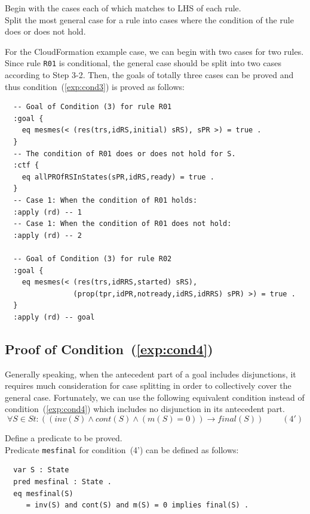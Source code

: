 \documentclass[12pt]{report}
\newcommand{\ra}{\rightarrow}
\begin{document}
\vspace{0.3cm}
 Begin with the cases each of which matches to
LHS of each rule. \\ 
 Split the most general case for a rule into
cases where the condition of the rule does or does not hold. 

For the CloudFormation example case, we can begin with two cases for
two rules. Since rule {\tt R01} is conditional, the general case
should be split into two cases according to Step 3-2. Then, the goals
of totally three cases can be proved and thus
condition~(\ref{exp:cond3}) is proved as follows:
\small
\begin{verbatim}
  -- Goal of Condition (3) for rule R01
  :goal {
    eq mesmes(< (res(trs,idRS,initial) sRS), sPR >) = true .
  }
  -- The condition of R01 does or does not hold for S.
  :ctf {
    eq allPROfRSInStates(sPR,idRS,ready) = true .
  }
  -- Case 1: When the condition of R01 holds:
  :apply (rd) -- 1
  -- Case 1: When the condition of R01 does not hold:
  :apply (rd) -- 2

  -- Goal of Condition (3) for rule R02
  :goal {
    eq mesmes(< (res(trs,idRRS,started) sRS),
                (prop(tpr,idPR,notready,idRS,idRRS) sPR) >) = true .
  }
  :apply (rd) -- goal

\end{verbatim}
\normalsize

\subsection{Proof of Condition~(\ref{exp:cond4})}
\label{sec:TOSCAmesfinal}
Generally speaking, when the antecedent part of a goal includes
disjunctions, it requires much consideration for case splitting in
order to collectively cover the general case. Fortunately, we can use
the following equivalent condition instead of
condition~(\ref{exp:cond4}) which includes no disjunction in its
antecedent part.
\[\forall S\in St:((inv(S)\land cont(S)\land(m(S) = 0))
  \ra final(S))~~~~~~~~~~(4')\]

\vspace{0.3cm}
 Define a predicate to be proved. \\ Predicate
         {\tt mesfinal} for condition~(4') can be defined as follows:
\small
\begin{verbatim}
  var S : State
  pred mesfinal : State .
  eq mesfinal(S)
     = inv(S) and cont(S) and m(S) = 0 implies final(S) .
\end{verbatim}
\normalsize
\end{document}
